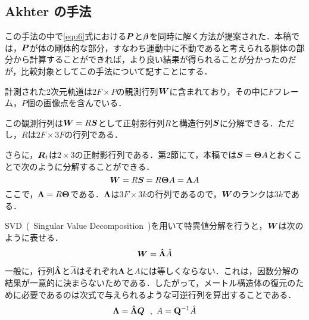 \documentclass[a4paper,10pt]{jarticle}
\begin{document}
\subsection{Akhter の手法}

この手法の中で\ref{equ6}式における$ \mbox{\boldmath $P$} $と$ \mbox{\boldmath $ \beta $}$を同時に解く方法が提案された．本稿では，$ \mbox{\boldmath $ P $}$が体の剛体的な部分，すなわち運動中に不動であると考えられる胴体の部分から計算することができれば，より良い結果が得られることが分かったのだが，比較対象としてこの手法について記すことにする．

計測された2次元軌道は$ 2F \times P $の観測行列$ \mbox{\boldmath $ W $}$に含まれており，その中に$ F $フレーム，$ P $個の画像点を含んでいる．

この観測行列は$ \mbox{\boldmath $ W $} = R \mbox{\boldmath $ S $}$として正射影行列$ R $と構造行列$ \mbox{\boldmath $ S $} $に分解できる．ただし，$ R $は$ 2F \times 3F $の行列である．

さらに，$ \mbox{\boldmath $ R $}_t $は$ 2 \times 3 $の正射影行列である．第2節にて，本稿では$ \mbox{\boldmath $ S $} = \mbox{\boldmath $ \Theta $} A $とおくことで次のように分解することができる．
%
\begin{equation}
 \mbox{\boldmath $ W $} = R \mbox{\boldmath $ S $} = R \mbox{\boldmath $ \Theta $} A = \mbox{\boldmath $ \Lambda $} A
\end{equation}
%
ここで，$ \mbox{\boldmath $ \Lambda $} = R \mbox{\boldmath $ \Theta $} $である．$ \mbox{\boldmath $ \Lambda $}  $は$ 3F \times 3k $の行列であるので，$ \mbox{\boldmath $ W $} $のランクは$ 3k $である．

SVD~(~Singular Value Decomposition~)を用いて特異値分解を行うと，$ \mbox{\boldmath $ W $} $は次のように表せる．
%
\begin{equation}
 \mbox{\boldmath $ W $} = \mbox{\boldmath $ \hat{\Lambda} $} {\hat{A}}
\end{equation}
%

一般に，行列$ \mbox{\boldmath $ \hat{\Lambda} $} $と$ \hat{A} $はそれぞれ$ \mbox{\boldmath $ \Lambda $} $と$ A $には等しくならない．これは，因数分解の結果が一意的に決まらないためである．したがって，メートル構造体の復元のために必要であるのは次式で与えられるような可逆行列を算出することである．
%
\begin{equation}
 \mbox{\boldmath $ \Lambda $} = \mbox{\boldmath $ \hat{\Lambda} $} \mbox{\boldmath $ Q $ } ~ , ~ A = {\bf Q}^{-1} \hat{A}
\end{equation}
%
\end{document}
